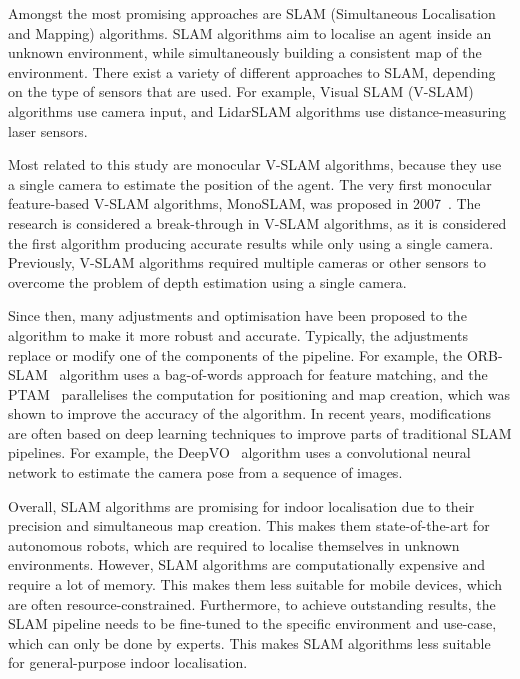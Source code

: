 \documentclass[a4paper]{article}
\begin{document}
  Amongst the most promising approaches are SLAM (Simultaneous Localisation and
  Mapping) algorithms. SLAM algorithms aim to localise an agent inside an
  unknown environment, while simultaneously building a consistent map of the
  environment. There exist a variety of different approaches to SLAM, depending
  on the type of sensors that are used. For example, Visual SLAM (V-SLAM)
  algorithms use camera input, and LidarSLAM algorithms use distance-measuring
  laser sensors. 

  Most related to this study are monocular V-SLAM algorithms, because they use a
  single camera to estimate the position of the agent. The very first monocular
  feature-based V-SLAM algorithms, MonoSLAM, was proposed in
  2007~\cite{mono-slam}. The research is considered a break-through in V-SLAM
  algorithms, as it is considered the first algorithm producing accurate results
  while only using a single camera. Previously, V-SLAM algorithms required
  multiple cameras or other sensors to overcome the problem of depth estimation
  using a single camera.

  Since then, many adjustments and optimisation have been proposed to the
  algorithm to make it more robust and accurate. Typically, the adjustments
  replace or modify one of the components of the pipeline. For example, the
  ORB-SLAM~\cite{orb-slam} algorithm uses a bag-of-words approach for feature
  matching, and the PTAM~\cite{ptam} parallelises the computation for
  positioning and map creation, which was shown to improve the accuracy of the
  algorithm. In recent years, modifications are often based on deep learning
  techniques to improve parts of traditional SLAM pipelines. For example, the
  DeepVO~\cite{deep-vo} algorithm uses a convolutional neural network to
  estimate the camera pose from a sequence of images. 

  Overall, SLAM algorithms are promising for indoor localisation due to their
  precision and simultaneous map creation. This makes them state-of-the-art for
  autonomous robots, which are required to localise themselves in unknown
  environments. However, SLAM algorithms are computationally expensive and
  require a lot of memory. This makes them less suitable for mobile devices,
  which are often resource-constrained. Furthermore, to achieve outstanding
  results, the SLAM pipeline needs to be fine-tuned to the specific environment
  and use-case, which can only be done by experts. This makes SLAM algorithms
  less suitable for general-purpose indoor localisation.
\end{document}
